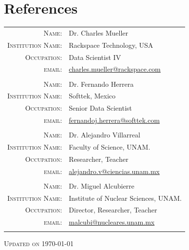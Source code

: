 \documentclass[a4paper,10pt]{article} %
\begin{document}
\section{References}
\bigskip
\begin{tabular}{rl}
	\textsc{Name:} & Dr. Charles Mueller \\
	\textsc{Institution Name:} & Rackspace Technology, USA \\
	\textsc{Occupation:} & Data Scientist IV\\
	\textsc{email:} & \href{mailto:charles.mueller@rackspace.com}{charles.mueller@rackspace.com}\\
	\multicolumn{2}{c}{} \\
	\textsc{Name:} & Dr. Fernando Herrera \\
	\textsc{Institution Name:} & Softtek, Mexico \\
	\textsc{Occupation:} & Senior Data Scientist\\
	\textsc{email:} & \href{mailto:fernandoj.herrera@softtek.com}{fernandoj.herrera@softtek.com}\\
	\multicolumn{2}{c}{} \\
	\textsc{Name:} & Dr. Alejandro Villarreal \\
	\textsc{Institution Name:} & Faculty of Science, UNAM.\\
	\textsc{Occupation:} & Researcher, Teacher\\
	\textsc{email:} & \href{mailto:alejandro.v@ciencias.unam.mx}{alejandro.v@ciencias.unam.mx}\\
	\multicolumn{2}{c}{} \\
	\textsc{Name:} & Dr. Miguel Alcubierre \\
	\textsc{Institution Name:} & Institute of Nuclear Sciences, UNAM.\\
	\textsc{Occupation:} & Director, Researcher, Teacher\\
	\textsc{email:} & \href{mailto:malcubi@nucleares.unam.mx}{malcubi@nucleares.unam.mx}\\
	\multicolumn{2}{c}{} \\
\end{tabular}
\vspace{0cm}
\begin{center}
	\textsc{Updated on \today}
\end{center}


\newpage

\end{document}
